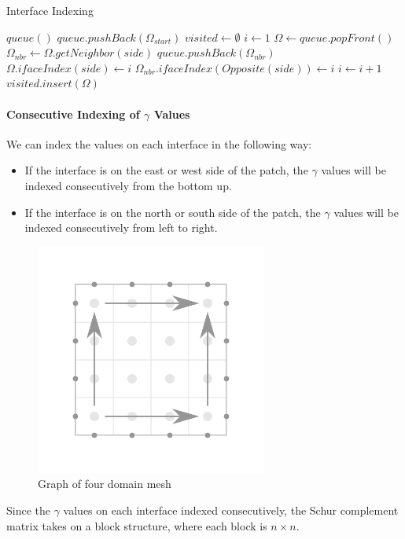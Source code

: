 \documentclass[12pt]{article}
\begin{document}
\begin{algorithm}[H]
\caption{Interface Indexing}
\begin{algorithmic}[1]
    \State $queue()$ 
    \State $queue.pushBack(\Omega_{start})$ 
    \State $visited \gets \emptyset$ 
    \State $i \gets 1$ 
     
        \State $\Omega \gets queue.popFront()$
                \State $\Omega_{nbr} \gets \Omega.getNeighbor(side)$
                    \State $queue.pushBack(\Omega_{nbr})$
                \EndIf
                \State $\Omega.ifaceIndex(side)\gets i$ 
                \State $\Omega_{nbr}.ifaceIndex(Opposite(side))\gets i$ 
                \State $i \gets i+1$
            \EndIf
        \EndFor
        \State $visited.insert(\Omega)$
    \EndWhile
    \EndProcedure
\end{algorithmic}
\label{indexbfs}
\end{algorithm}

\paragraph{Consecutive Indexing of $\gamma$ Values} 
We can index the values on each interface in the following way:
\begin{itemize}
    \item If the interface is on the east or west side of the patch, the $\gamma$ values will be indexed consecutively from the bottom up.
    \item If the interface is on the north or south side of the patch, the $\gamma$ values will be indexed consecutively from left to right.
\end{itemize}
\begin{figure}
    \label{indexing}
    \centering
    \includegraphics[width=3in]{images/indexing.pdf}
    \caption{Graph of four domain mesh}
\end{figure}
Since the $\gamma$ values on each interface indexed consecutively, the Schur complement matrix takes
on a block structure, where each block is $n\times n$.
\end{document}
